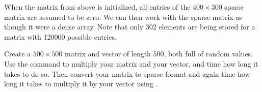 When the matrix  from above is initialized, all entries of the $400 \times 300$  sparse matrix are assumed to be zero. 
We can then work with the sparse matrix as though it were a dense array.
Note that only 302 elements are being stored for a matrix with 120000 possible entries. 

\begin{problem}
Create a $500\times 500$ matrix and vector of length 500, both full of random values. Use the  command to multiply your matrix and your vector, and time how long it takes to do so. Then convert your matrix to sparse format and again time how long it takes to multiply it by your vector using .
\end{problem}
 
